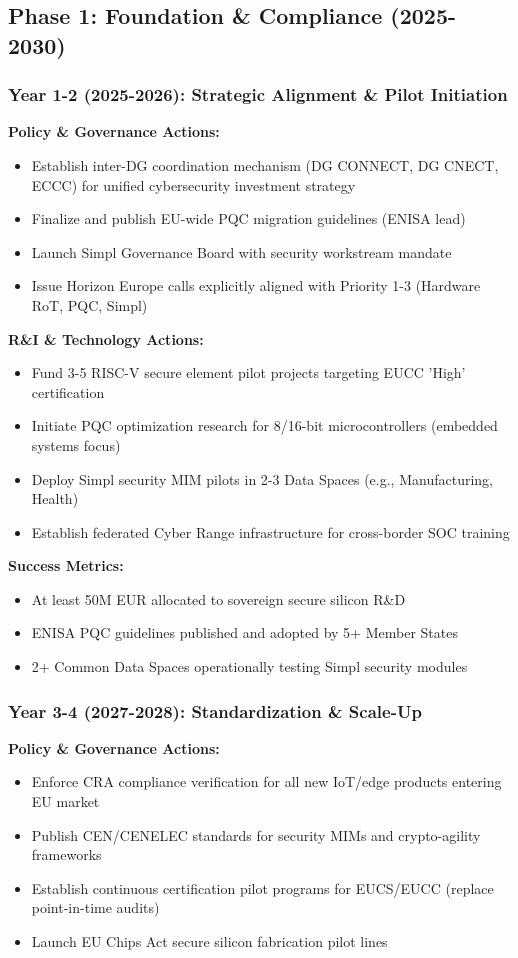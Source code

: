 \documentclass[12pt,a4paper]{article}
\begin{document}
\subsection*{Phase 1: Foundation \& Compliance (2025-2030)}

\subsubsection*{Year 1-2 (2025-2026): Strategic Alignment \& Pilot Initiation}
\textbf{Policy \& Governance Actions:}
\begin{itemize}
    \item Establish inter-DG coordination mechanism (DG CONNECT, DG CNECT, ECCC) for unified cybersecurity investment strategy
    \item Finalize and publish EU-wide PQC migration guidelines (ENISA lead)
    \item Launch Simpl Governance Board with security workstream mandate
    \item Issue Horizon Europe calls explicitly aligned with Priority 1-3 (Hardware RoT, PQC, Simpl)
\end{itemize}

\textbf{R\&I \& Technology Actions:}
\begin{itemize}
    \item Fund 3-5 RISC-V secure element pilot projects targeting EUCC 'High' certification
    \item Initiate PQC optimization research for 8/16-bit microcontrollers (embedded systems focus)
    \item Deploy Simpl security MIM pilots in 2-3 Data Spaces (e.g., Manufacturing, Health)
    \item Establish federated Cyber Range infrastructure for cross-border SOC training
\end{itemize}

\textbf{Success Metrics:}
\begin{itemize}
    \item At least 50M EUR allocated to sovereign secure silicon R\&D
    \item ENISA PQC guidelines published and adopted by 5+ Member States
    \item 2+ Common Data Spaces operationally testing Simpl security modules
\end{itemize}

\subsubsection*{Year 3-4 (2027-2028): Standardization \& Scale-Up}
\textbf{Policy \& Governance Actions:}
\begin{itemize}
    \item Enforce CRA compliance verification for all new IoT/edge products entering EU market
    \item Publish CEN/CENELEC standards for security MIMs and crypto-agility frameworks
    \item Establish continuous certification pilot programs for EUCS/EUCC (replace point-in-time audits)
    \item Launch EU Chips Act secure silicon fabrication pilot lines
\end{itemize}
\end{document}
